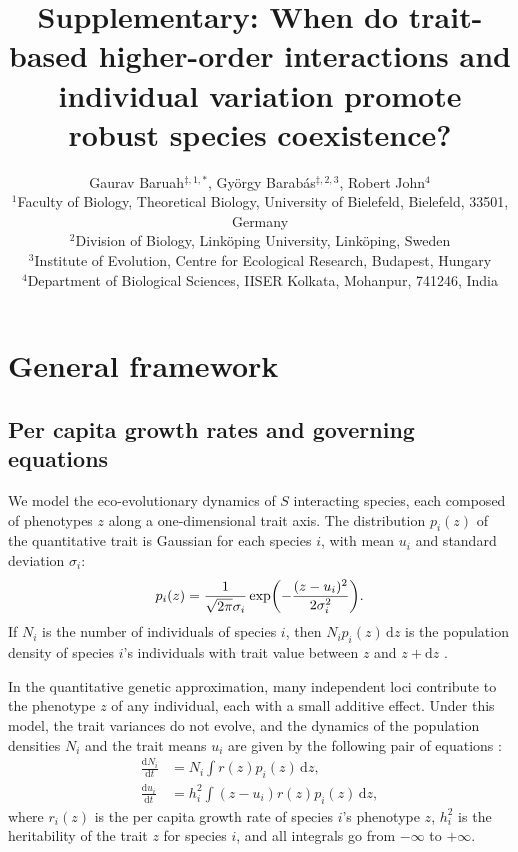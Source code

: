 \documentclass[10pt]{article}
\newcommand{\ud}{\text{d}}
\let\originalleft\left
\let\originalright\right
\renewcommand{\left}{\mathopen{}\mathclose\bgroup\originalleft}
\renewcommand{\right}{\aftergroup\egroup\originalright}
\begin{document}
\title{Supplementary: When do trait-based higher-order interactions and individual variation promote robust species coexistence?}

\author{Gaurav Baruah$^{\ddag, 1,\ast}$, Gy\"orgy Barab\'as$^{\ddag, 2,3}$, Robert John$^4$\\
$^1$\small{Faculty of Biology, Theoretical Biology, University of Bielefeld, Bielefeld, 33501, Germany}\\
$^2$\small{Division of Biology, Link\"oping University, Link\"oping, Sweden}\\
$^3$\small{Institute of Evolution, Centre for Ecological Research, Budapest, Hungary}\\
$^4$\small{Department of Biological Sciences, IISER Kolkata, Mohanpur, 741246, India}
}

\date{}

\maketitle


\section{General framework}

\subsection{Per capita growth rates and governing equations}

We model the eco-evolutionary dynamics of $S$ interacting species, each composed of phenotypes $z$ along a one-dimensional trait axis. The distribution $p_i(z)$ of the quantitative trait is Gaussian for each species $i$, with mean $u_{i}$ and standard deviation $\sigma_{i}$:
\begin{equation}
  \label{eq:p}
  p_i(z) = \frac{1}{\sqrt{2\pi} \sigma_i} \exp \left(-\frac{(z-u_i)^2}{2\sigma_i^2} \right) .
\end{equation} 
If $N_i$ is the number of individuals of species $i$, then $N_i p_i(z) \,\ud z$ is the population density of species $i$'s individuals with trait value between $z$ and $z+\ud z$ \citep{lande_adaptation_2009}.

In the quantitative genetic approximation, many independent loci contribute to the phenotype $z$ of any individual, each with a small additive effect. Under this model, the trait variances do not evolve, and the dynamics of the population densities $N_i$ and the trait means $u_i$ are given by the following pair of equations \citep{barabas_effect_2016, pastore_evolution_2021, akesson_importance_2021, barabas_evolution_2022}:
\begin{align}
  \label{eq:n}
  \frac{\ud N_i}{\ud t} &= N_i \int r(z) p_i(z) \,\ud z ,\\
  \label{eq:m}
  \frac{\ud u_i}{\ud t} &= h_i^2 \int (z-u_i) r(z) p_i(z) \,\ud z ,
\end{align}
where $r_i(z)$ is the per capita growth rate of species $i$'s phenotype $z$, $h_i^2$ is the heritability of the trait $z$ for species $i$, and all integrals go from $-\infty$ to $+\infty$.
\end{document}

